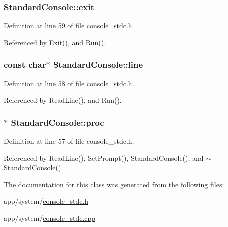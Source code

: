 \subsubsection[{\texorpdfstring{exit}{exit}}]{ Standard\+Console\+::exit\hspace{0.3cm}{\ttfamily [private]}}\hypertarget{classStandardConsole_a67538cb9ac4d002b2341386fab0b1f13}{}\label{classStandardConsole_a67538cb9ac4d002b2341386fab0b1f13}


Definition at line 59 of file console\+\_\+stdc.\+h.



Referenced by Exit(), and Run().

\subsubsection[{\texorpdfstring{line}{line}}]{\setlength{\rightskip}{0pt plus 5cm}const char$\ast$ Standard\+Console\+::line\hspace{0.3cm}{\ttfamily [private]}}\hypertarget{classStandardConsole_a2ed234e29cf0056dfdc40bac5f7dd438}{}\label{classStandardConsole_a2ed234e29cf0056dfdc40bac5f7dd438}


Definition at line 58 of file console\+\_\+stdc.\+h.



Referenced by Read\+Line(), and Run().

\subsubsection[{\texorpdfstring{proc}{proc}}]{$\ast$ Standard\+Console\+::proc\hspace{0.3cm}{\ttfamily [private]}}\hypertarget{classStandardConsole_a0b6899785e858b50d8b632cc546b347a}{}\label{classStandardConsole_a0b6899785e858b50d8b632cc546b347a}


Definition at line 57 of file console\+\_\+stdc.\+h.



Referenced by Read\+Line(), Set\+Prompt(), Standard\+Console(), and $\sim$\+Standard\+Console().



The documentation for this class was generated from the following files\+:\begin{DoxyCompactItemize}
\item 
app/system/\hyperlink{console__stdc_8h}{console\+\_\+stdc.\+h}\item 
app/system/\hyperlink{console__stdc_8cpp}{console\+\_\+stdc.\+cpp}\end{DoxyCompactItemize}

